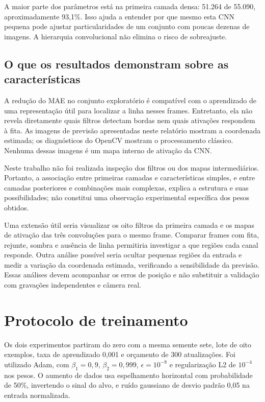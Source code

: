 \documentclass[a4paper,oneside,11pt]{article}
\begin{document}
A maior parte dos parâmetros está na primeira camada densa: 51.264 de 55.090, aproximadamente 93,1\%. Isso ajuda a entender por que mesmo esta CNN pequena pode ajustar particularidades de um conjunto com poucas dezenas de imagens. A hierarquia convolucional não elimina o risco de sobreajuste.

\subsection{O que os resultados demonstram sobre as características}
A redução do MAE no conjunto exploratório é compatível com o aprendizado de uma representação útil para localizar a linha nesses frames. Entretanto, ela não revela diretamente quais filtros detectam bordas nem quais ativações respondem à fita. As imagens de previsão apresentadas neste relatório mostram a coordenada estimada; os diagnósticos do OpenCV mostram o processamento clássico. Nenhuma dessas imagens é um mapa interno de ativação da CNN.

Neste trabalho não foi realizada inspeção dos filtros ou dos mapas intermediários. Portanto, a associação entre primeiras camadas e características simples, e entre camadas posteriores e combinações mais complexas, explica a estrutura e suas possibilidades; não constitui uma observação experimental específica dos pesos obtidos.

Uma extensão útil seria visualizar os oito filtros da primeira camada e os mapas de ativação das três convoluções para o mesmo frame. Comparar frames com fita, rejunte, sombra e ausência de linha permitiria investigar a que regiões cada canal responde. Outra análise possível seria ocultar pequenas regiões da entrada e medir a variação da coordenada estimada, verificando a sensibilidade da previsão. Essas análises devem acompanhar os erros de posição e não substituir a validação com gravações independentes e câmera real.

\section{Protocolo de treinamento}
Os dois experimentos partiram do zero com a mesma semente sete, lote de oito exemplos, taxa de aprendizado 0,001 e orçamento de 300 atualizações. Foi utilizado Adam, com $\beta_1=0,9$, $\beta_2=0,999$, $\epsilon=10^{-8}$ e regularização L2 de $10^{-4}$ nos pesos. O aumento de dados usa espelhamento horizontal com probabilidade de 50\%, invertendo o sinal do alvo, e ruído gaussiano de desvio padrão 0,05 na entrada normalizada.
\end{document}
